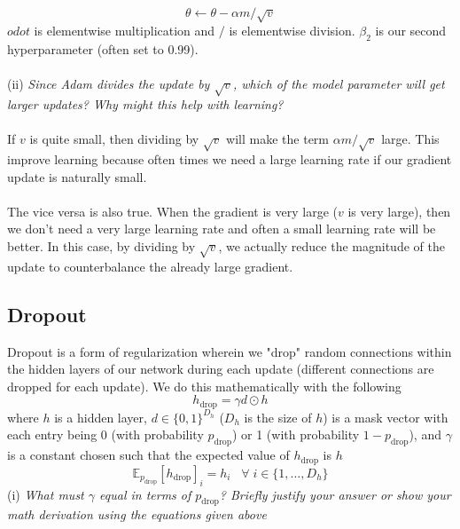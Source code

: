 \documentclass[12pt]{article}
\begin{document}
\begin{equation*}
    \theta \leftarrow \theta - \alpha m / \sqrt{v}
\end{equation*}
$odot$ is elementwise multiplication and $/$ is elementwise division. $\beta_2$ is our second 
hyperparameter (often set to 0.99). 
~\\
~\\
(ii) \emph{Since Adam divides the update by $\sqrt{v}$, which of the model parameter will get larger updates? 
Why might this help with learning?}
~\\
~\\
If $v$ is quite small, then dividing by $\sqrt{v}$ will make the term $\alpha m / \sqrt{v}$ large.
This improve learning because often times we need a large learning rate if our gradient update is naturally
small. 
~\\
~\\
The vice versa is also true. When the gradient is very large ($v$ is very large), then we don't
need a very large learning rate and often a small learning rate will be better. In this 
case, by dividing by $\sqrt{v}$, we actually reduce the magnitude of the update to counterbalance
the already large gradient. 

\subsection{Dropout}

Dropout is a form of regularization wherein we "drop" random connections within the 
hidden layers of our network during each update (different connections are 
dropped for each update). We do this mathematically with the following
\begin{equation*}
    h_{\text{drop}} = \gamma d \odot h 
\end{equation*}
where $h$ is a hidden layer, $d \in \{0, 1\}^{D_h}$ ($D_h$ is the size of $h$) is a mask vector
with each entry being 0 (with probability $p_{\text{drop}}$) or 1 (with probability 
$1 - p_{\text{drop}}$), and $\gamma$ is a constant chosen such that the expected 
value of $h_{\text{drop}}$ is $h$
\begin{equation*}
    \mathbb{E}_{p_{\text{drop}}} [h_{\text{drop}}]_i = h_i \; \; \; \forall \; i \in \{1, \dotso, D_h\}
\end{equation*}
(i) \emph{What must $\gamma$ equal in terms of $p_{\text{drop}}$? Briefly justify your answer or 
show your math derivation using the equations given above}
\end{document}
